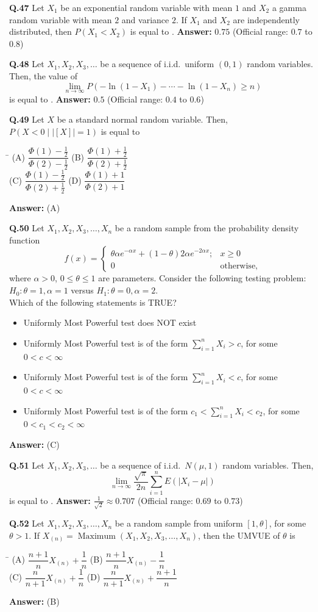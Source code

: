 \documentclass[11pt,a4paper]{article}
\newcommand{\optsfourA}[4]{%
  \begin{tabbing}
    \hspace{0.48\linewidth}\=\kill
    (A) #1 \> (B) #2 \\[2pt]
    (C) #3 \> (D) #4
  \end{tabbing}%
}
\newcommand{\optslistA}[4]{%
  \begin{itemize}
    \setlength{\itemsep}{2pt}\setlength{\parskip}{0pt}
    \item[(A)] #1
    \item[(B)] #2
    \item[(C)] #3
    \item[(D)] #4
  \end{itemize}%
}
\newcommand{\ans}[1]{\textbf{Answer:} #1\par\medskip}
\begin{document}
\textbf{Q.47} Let $X_1$ be an exponential random variable with mean $1$ and $X_2$ a gamma random variable with mean $2$ and variance $2$. If $X_1$ and $X_2$ are independently distributed, then $P(X_1 < X_2)$ is equal to \underline{\hspace{2cm}}.
\ans{$0.75$ (Official range: $0.7$ to $0.8$)}

\textbf{Q.48} Let $X_1, X_2, X_3, \dots$ be a sequence of i.i.d.\ uniform $(0, 1)$ random variables. Then, the value of
\[
  \lim_{n\to\infty} P(-\ln(1 - X_1) - \cdots - \ln(1 - X_n) \ge n)
\]
is equal to \underline{\hspace{2cm}}.
\ans{$0.5$ (Official range: $0.4$ to $0.6$)}

\textbf{Q.49} Let $X$ be a standard normal random variable. Then, $P(X < 0 \mid |[X]| = 1)$ is equal to
\optsfourA{$\dfrac{\Phi(1) - \frac{1}{2}}{\Phi(2) - \frac{1}{2}}$}{$\dfrac{\Phi(1) + \frac{1}{2}}{\Phi(2) + \frac{1}{2}}$}{$\dfrac{\Phi(1) - \frac{1}{2}}{\Phi(2) + \frac{1}{2}}$}{$\dfrac{\Phi(1) + 1}{\Phi(2) + 1}$}
\ans{(A)}

\textbf{Q.50} Let $X_1, X_2, X_3, \dots, X_n$ be a random sample from the probability density function
\[
  f(x) = \begin{cases}
    \theta \alpha e^{-\alpha x} + (1 - \theta) 2\alpha e^{-2\alpha x}; & x \ge 0 \\
    0 & \text{otherwise,}
  \end{cases}
\]
where $\alpha > 0$, $0 \le \theta \le 1$ are parameters. Consider the following testing problem:\\
$H_0 : \theta = 1, \alpha = 1$ versus $H_1 : \theta = 0, \alpha = 2$.\\
Which of the following statements is TRUE?
\optslistA{Uniformly Most Powerful test does NOT exist}{Uniformly Most Powerful test is of the form $\sum_{i=1}^{n} X_i > c$, for some $0 < c < \infty$}{Uniformly Most Powerful test is of the form $\sum_{i=1}^{n} X_i < c$, for some $0 < c < \infty$}{Uniformly Most Powerful test is of the form $c_1 < \sum_{i=1}^{n} X_i < c_2$, for some $0 < c_1 < c_2 < \infty$}
\ans{(C)}

\textbf{Q.51} Let $X_1, X_2, X_3, \dots$ be a sequence of i.i.d.\ $N(\mu, 1)$ random variables. Then,
\[
  \lim_{n\to\infty} \frac{\sqrt{\pi}}{2n} \sum_{i=1}^{n} E(|X_i - \mu|)
\]
is equal to \underline{\hspace{2cm}}.
\ans{$\frac{1}{\sqrt{2}} \approx 0.707$ (Official range: $0.69$ to $0.73$)}

\textbf{Q.52} Let $X_1, X_2, X_3, \dots, X_n$ be a random sample from uniform $[1, \theta]$, for some $\theta > 1$. If $X_{(n)} = \operatorname{Maximum}(X_1, X_2, X_3, \dots, X_n)$, then the UMVUE of $\theta$ is
\optsfourA{$\dfrac{n+1}{n} X_{(n)} + \dfrac{1}{n}$}{$\dfrac{n+1}{n} X_{(n)} - \dfrac{1}{n}$}{$\dfrac{n}{n+1} X_{(n)} + \dfrac{1}{n}$}{$\dfrac{n}{n+1} X_{(n)} + \dfrac{n+1}{n}$}
\ans{(B)}
\end{document}
